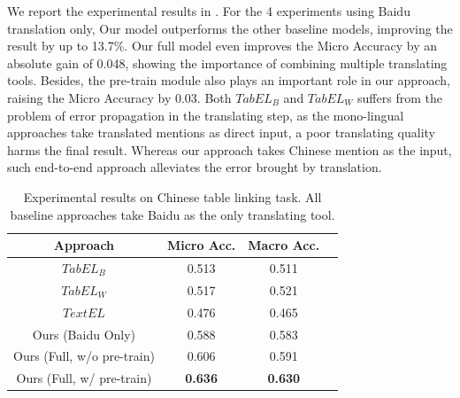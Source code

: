 We report the experimental results in .
For the 4 experiments using Baidu translation only, 
Our model outperforms the other baseline models, improving the result by up to 13.7\%.
Our full model even improves the Micro Accuracy by an absolute gain of 0.048,
showing the importance of combining multiple translating tools.
Besides, the pre-train module also plays an important role in our approach,
raising the Micro Accuracy by 0.03.
Both $TabEL_B$ and $TabEL_W$ suffers from the problem of error propagation
in the translating step, as the mono-lingual approaches take translated mentions
as direct input, a poor translating quality harms the final result.
Whereas our approach takes Chinese mention as the input, such end-to-end approach
alleviates the error brought by translation.




\begin{table}[ht]
\centering
\caption{Experimental results on Chinese table linking task.
All baseline approaches take Baidu as the only translating tool.}
\label{tab:main-result}
\begin{tabular} {c|c|cc}
    Approach          & Micro Acc.   & Macro Acc.    \\
    \hline
    $TabEL_B$         &  0.513       & 0.511         \\
    $TabEL_W$         &  0.517       & 0.521         \\     %
    $TextEL$          &  0.476       & 0.465         \\
    Ours (Baidu Only) &  0.588       & 0.583         \\
    \hline
    Ours (Full, w/o pre-train) &  0.606    &  0.591        \\ 
    Ours (Full, w/ pre-train)  &  \textbf{0.636}       & \textbf{0.630}         \\
\end{tabular}
\end{table}

